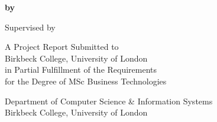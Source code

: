 \begin{center}

\thispagestyle{empty}
\null
\vfill

\LARGE
\textbf{\thetitle}
\large

\vspace{0.3in}

\Large
\textbf{by \theauthor}\\
\large

\vspace{0.8in}

Supervised by \supervisor\\

\vspace{0.3in}

A Project Report Submitted to\\
Birkbeck College, University of London\\
in Partial Fulfillment of the Requirements\\
for the Degree of MSc Business Technologies

\vspace{0.3in}

Department of Computer Science \& Information Systems\\
Birkbeck College, University of London

\vspace{0.3in}

\thedate

\vspace{1in}

\end{center}